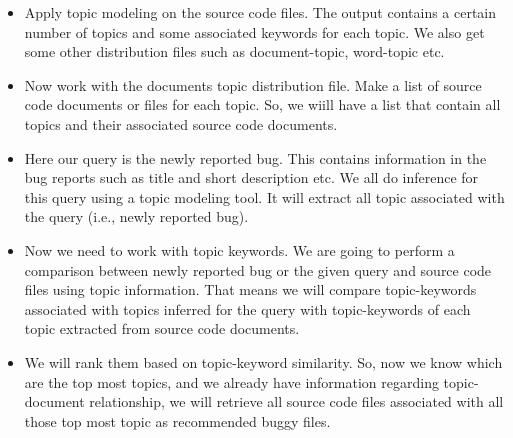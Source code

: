 \documentclass{sig-alternate}
\begin{document}
\begin{itemize}
	\itemsep 0em
	\item Apply topic modeling on the source code files. The output contains a certain number of topics and some associated keywords for each topic. We also get some other distribution files such as document-topic, word-topic etc.
	\item Now work with the documents topic distribution file. Make a list of source code documents or files for each topic. So, we wiill have a list that contain all topics and their associated source code documents.
	\item Here our query is the newly reported bug. This contains information in the bug reports such as title and short description etc. We all do inference for this query using a topic modeling tool. It will extract all topic associated with the query (i.e., newly reported bug).
	\item Now we need to work with topic keywords. We are going to perform a comparison between newly reported bug or the given query and source code files using topic information. That means we will compare topic-keywords associated with topics inferred for the query with topic-keywords of each topic extracted from source code documents.
	\item We will rank them based on topic-keyword similarity. So, now we know which are the top most topics, and we already have information regarding topic-document relationship, we will retrieve all source code files associated with all those top most topic as recommended buggy files.
\end{itemize}
\end{document}
